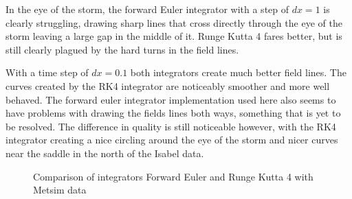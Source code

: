 \documentclass{article}
\begin{document}
In the eye of the storm, the forward Euler integrator with a step of $dx = 1$ is
clearly struggling, drawing sharp lines that cross directly through the eye of
the storm leaving a large gap in the middle of it. Runge Kutta 4 fares better,
but is still clearly plagued by the hard turns in the field lines.

With a time step of $dx = 0.1$ both integrators create much better field lines.
The curves created by the RK4 integrator are noticeably smoother and more well behaved.
The forward euler integrator implementation used here also seems to have problems
with drawing the fields lines both ways, something that is yet to be resolved. The
difference in quality is still noticeable however, with the RK4 integrator creating
a nice circling around the eye of the storm and nicer curves near the saddle in the
north of the Isabel data.

\begin{figure}
\caption{Comparison of integrators Forward Euler and Runge Kutta 4 with Metsim data}
\end{figure}
\end{document}
